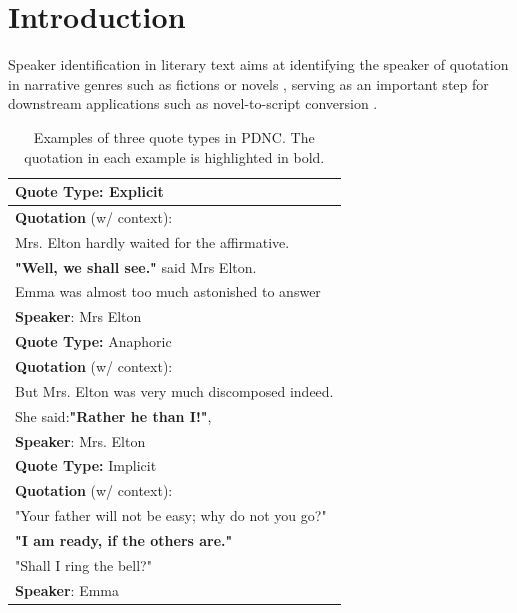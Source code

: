\documentclass[letterpaper]{article} %
\begin{document}
\section{Introduction}

Speaker identification in literary text aims at identifying the speaker of quotation in narrative genres such as fictions or novels \citep{DBLP:conf/aaai/ElsonM10}, serving as an important step for downstream applications such as novel-to-script conversion \citep{DBLP:conf/taai/SooYS19}. 

\begin{table}[ht]
\centering
\begin{tabular}{l}
\toprule
\textbf{Quote Type:} Explicit \\
\midrule
\textbf{Quotation} (w/ context): \\
\small{Mrs. Elton hardly waited for the affirmative.}\\
\small{ \textbf{"Well, we shall see."} said Mrs Elton.}\\
\small{Emma was almost too much astonished to answer}\\

\textbf{Speaker}: Mrs Elton  \\
\midrule
\midrule
\textbf{Quote Type:} Anaphoric \\
\midrule
\textbf{Quotation} (w/ context): \\
\small{But Mrs. Elton was very much discomposed indeed.}\\
\small{She said:\textbf{"Rather he than I!"},}\\

\textbf{Speaker}: Mrs. Elton \\
\midrule
\midrule
\textbf{Quote Type:} Implicit\\
\midrule
\textbf{Quotation} (w/ context): \\
\small{"Your father will not be easy; why do not you go?"}\\
\small{\textbf{"I am ready, if the others are."}}\\
\small{"Shall I ring the bell?"}\\
\textbf{Speaker}: Emma \\
\bottomrule
\end{tabular}
\caption{Examples of three quote types in PDNC. The quotation in each example is highlighted in bold.}
\label{tab:type}
\end{table}
\end{document}
